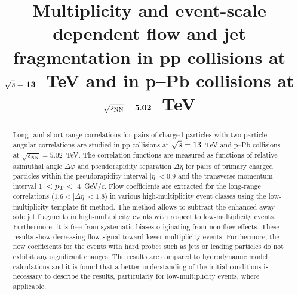 \documentclass[ALICE,manyauthors]{cernphprep}
\begin{document}
\begin{titlepage}

\PHyear{}
\PHdate{\today}
%

\title{Multiplicity and event-scale dependent flow and jet fragmentation in pp collisions at ${\sqrt{{\textit s}}}=\mathbf{13}$~TeV and in p--Pb collisions at ${\sqrt{{\textit s_\mathrm{NN}}}} = \mathbf{5.02}$~TeV}


\begin{abstract}
%
Long- and short-range correlations for pairs of charged particles with two-particle angular correlations are studied in pp collisions at ${\sqrt{{\textit s}}}=13$~TeV and p--Pb collisions at ${\sqrt{s_\mathrm{NN}}} = 5.02$~TeV. The correlation functions are measured as functions of relative azimuthal angle $\Delta\varphi$ and pseudorapidity separation $\Delta\eta$ for pairs of primary charged particles within the pseudorapidity interval $|\eta| < 0.9$ and the transverse momentum interval 1~$ < p_\mathrm{T} < $~4~GeV/$c$.
Flow coefficients are extracted for the long-range correlations ($1.6 < |\Delta\eta| <1.8$) in various high-multiplicity event classes using the low-multiplicity template fit method. The method allows to subtract the enhanced away-side jet fragments in high-multiplicity events with respect to low-multiplicity events. Furthermore, it is free from systematic biases originating from non-flow effects. These results show decreasing flow signal toward lower multiplicity events. Furthermore, the flow coefficients for the events with hard probes such as jets or leading particles do not exhibit any significant changes. The results are compared to hydrodynamic model calculations and it is found that a better understanding of the initial conditions is necessary to describe the results, particularly for low-multiplicity events, where applicable.





\end{abstract}

\end{titlepage}
\end{document}
